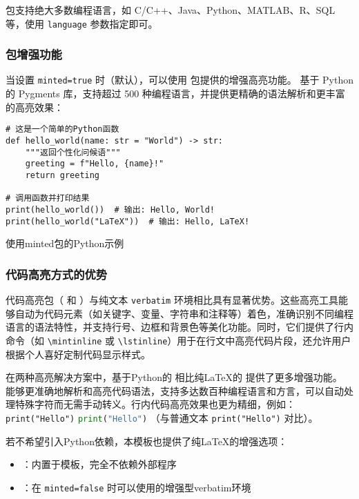  包支持绝大多数编程语言，如 C/C++、Java、Python、MATLAB、R、SQL 等，使用 \texttt{language} 参数指定即可。

\subsubsection{ 包增强功能}

当设置 \texttt{minted=true} 时（默认），可以使用  包提供的增强高亮功能。 基于 Python 的 Pygments 库，支持超过 500 种编程语言，并提供更精确的语法解析和更丰富的高亮效果：

\makeatletter
\iftongjithesis@minted
\begin{listing}[!htb]
  \begin{verbatim}
# 这是一个简单的Python函数
def hello_world(name: str = "World") -> str:
    """返回个性化问候语"""
    greeting = f"Hello, {name}!"
    return greeting

# 调用函数并打印结果
print(hello_world())  # 输出: Hello, World!
print(hello_world("LaTeX"))  # 输出: Hello, LaTeX!
  \end{verbatim}
  \caption{使用minted包的Python示例}\label{listing:minted-example}
\end{listing}
\fi
\makeatother

\subsubsection{代码高亮方式的优势}

代码高亮包（ 和 ）与纯文本 \verb|verbatim| 环境相比具有显著优势。这些高亮工具能够自动为代码元素（如关键字、变量、字符串和注释等）着色，准确识别不同编程语言的语法特性，并支持行号、边框和背景色等美化功能。同时，它们提供了行内命令（如 \verb|\mintinline| 或 \verb|\lstinline|）用于在行文中高亮代码片段，还允许用户根据个人喜好定制代码显示样式。

在两种高亮解决方案中，基于Python的  相比纯\LaTeX{}的  提供了更多增强功能。 能够更准确地解析和高亮代码语法，支持多达数百种编程语言和方言，可以自动处理特殊字符而无需手动转义。行内代码高亮效果也更为精细，例如：
\makeatletter
\iftongjithesis@minted
  \texttt{print("Hello")}
\else
  \lstinline[language=Python]{print("Hello")}
\fi
\makeatother
（与普通文本 \verb|print("Hello")| 对比）。

若不希望引入Python依赖，本模板也提供了纯\LaTeX{}的增强选项：
\begin{itemize}
  \item \textbf{}：内置于模板，完全不依赖外部程序
  \item \textbf{}：在 \texttt{minted=false} 时可以使用的增强型verbatim环境
\end{itemize}

